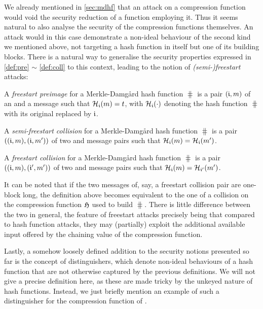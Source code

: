\bigskip

We already mentioned in \autoref{sec:mdhf} that an attack on a compression function would void the security reduction of a \merkdam function employing it. Thus it seems natural to also
analyse the security of the compression functions themselves. An attack would in this case demonstrate a non-ideal behaviour of the second kind we mentioned above, not targeting
a hash function in itself but one of its building blocks. There is a natural way to generalise the security properties expressed in \autoref{def:pre} $\sim$ \autoref{def:coll} to this context,
leading to the notion of \emph{(semi-)freestart} attacks:

\begin{defi}
A \emph{freestart preimage} for a Merkle-Damg\aa rd hash function $\hash$ is a pair $(\mathfrak{i},m)$
of an \iv and a message such that $\operatorname{\mathcal{H}}_{\mathfrak{i}}(m) = t$, with $\operatorname{\mathcal{H}}_{\mathfrak{i}}(\cdot)$ denoting
the hash function $\hash$ with its original \iv replaced by $\mathfrak{i}$.
\label{def:free_pre}
\end{defi}

\begin{defi}
A \emph{semi-freestart collision} for a Merkle-Damg\aa rd hash function $\hash$ is a pair $((\mathfrak{i},m), (\mathfrak{i},m'))$
of two \iv and message pairs such that $\operatorname{\mathcal{H}}_{\mathfrak{i}}(m) = \operatorname{\mathcal{H}}_{\mathfrak{i}}(m')$.
\label{def:semi-free_coll}
\end{defi}

\begin{defi}
A \emph{freestart collision} for a Merkle-Damg\aa rd hash function $\hash$ is a pair $((\mathfrak{i},m), (\mathfrak{i}',m'))$
of two \iv and message pairs such that $\operatorname{\mathcal{H}}_{\mathfrak{i}}(m) = \operatorname{\mathcal{H}}_{\mathfrak{i}'}(m')$.
\label{def:free_coll}
\end{defi}

It can be noted that if the two messages of, say, a freestart collision pair are one-block long, the definition above becomes equivalent to the one of a collision
on the compression function $\operatorname{\mathfrak{H}}$ used to build $\hash$.
There is little difference between the two in general, the feature of freestart attacks precisely being that compared to hash function attacks, they may (partially) exploit the additional available input offered by the chaining value
of the compression function.


\bigskip

Lastly, a somehow loosely defined addition to the security notions presented so far is the concept of distinguishers, which denote non-ideal behaviours
of a hash function that are not otherwise captured by the previous definitions. We will not give a precise definition here, as these are made tricky by
the unkeyed nature of hash functions. Instead, we just briefly mention an example of such a distinguisher for the compression function of \shaone.

